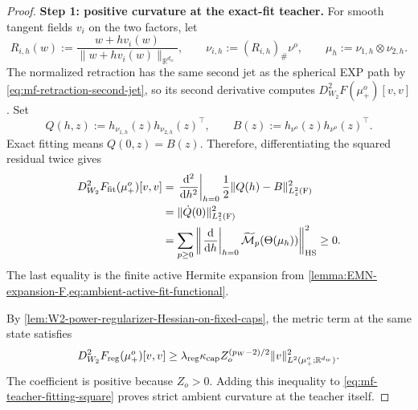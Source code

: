 \begin{proof}
\noindent\textbf{Step 1: positive curvature at the exact-fit teacher.}
For smooth tangent fields \(v_i\) on the two factors, let
\[
 R_{i,h}(w):=\frac{w+hv_i(w)}{\|w+hv_i(w)\|_{\mathbb R^{d_w}}},
 \qquad
 \nu_{i,h}:=(R_{i,h})_\#\nu^o,
 \qquad
 \mu_h:=\nu_{1,h}\otimes\nu_{2,h}.
\]
The normalized retraction has the same second jet as the spherical EXP path
by \cref{eq:mf-retraction-second-jet}, so its second derivative computes
\(D_{W_2}^2F(\mu_+^o)[v,v]\). Set
\[
 Q(h,z):=h_{\nu_{1,h}}(z)h_{\nu_{2,h}}(z)^\top,
 \qquad
 B(z):=h_{\nu^o}(z)h_{\nu^o}(z)^\top.
\]
Exact fitting means \(Q(0,z)=B(z)\). Therefore, differentiating the squared
residual twice gives
\begin{align}
 D_{W_2}^2F_{\mathrm{fit}}(\mu_+^o)[v,v]
 &=\left.\frac{\dd^2}{\dd h^2}\right|_{h=0}
   \frac12\|Q(h)-B\|_{L^2_z(\mathrm F)}^2\notag\\
 &=\|\dot Q(0)\|_{L^2_z(\mathrm F)}^2\notag\\
 &=\sum_{p\ge0}\left\|
   \left.\frac{\dd}{\dd h}\right|_{h=0}
   \widetilde{\mathcal M}_p(\Theta(\mu_h))
   \right\|_{\mathrm{HS}}^2\ge0.
 \label{eq:mf-teacher-fitting-square}
\end{align}
The last equality is the finite active Hermite expansion from
\cref{lemma:EMN-expansion-F,eq:ambient-active-fit-functional}.

By \cref{lem:W2-power-regularizer-Hessian-on-fixed-caps}, the metric term at
the same state satisfies
\[
 D_{W_2}^2F_{\mathrm{reg}}(\mu_+^o)[v,v]
 \ge\lambda_{\mathrm{reg}}\kappa_{\mathrm{cap}}Z_o^{(p_W-2)/2}
      \|v\|_{L^2(\mu_+^o;\mathbb R^{d_w})}^2.
\]
The coefficient is positive because \(Z_o>0\). Adding this inequality to
\cref{eq:mf-teacher-fitting-square} proves strict ambient curvature at the
teacher itself.


\end{proof}
